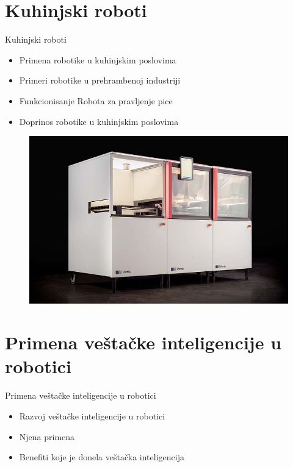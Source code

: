 \documentclass{beamer}
\begin{document}
\section{Kuhinjski roboti}
\begin{frame}{Kuhinjski roboti}
   \begin{itemize}
      \item Primena robotike u kuhinjskim poslovima
      \item Primeri robotike u prehrambenoj industriji
      \item Funkcionisanje Robota za pravljenje pice
      \item Doprinos robotike u kuhinjskim poslovima
       \end{itemize}

   
   \begin{figure}
       \centering
       \includegraphics[scale=0.20]{picnic-featured-image-web.jpg}
   \end{figure}
\end{frame}  
\section{Primena veštačke inteligencije u robotici}
\begin{frame}{Primena veštačke inteligencije u robotici}
   \begin{itemize}
       \item Razvoj veštačke inteligencije u robotici
       \item Njena primena
       \item Benefiti koje je donela veštačka inteligencija
   \end{itemize}
    
\end{frame}
    
\end{document}
